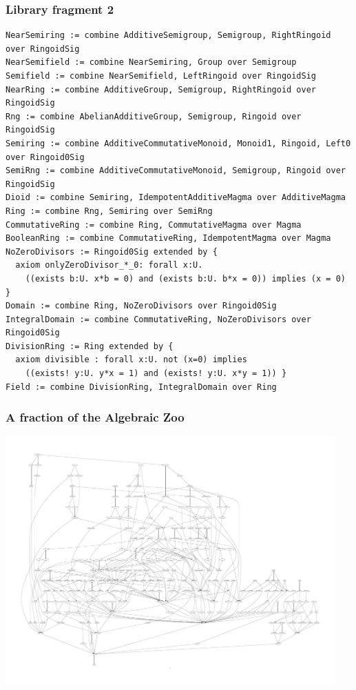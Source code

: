 \documentclass{beamer}
\begin{document}
\begin{frame}[t,fragile]
\frametitle{Library fragment 2}
\begin{lstlisting}
NearSemiring := combine AdditiveSemigroup, Semigroup, RightRingoid over RingoidSig
NearSemifield := combine NearSemiring, Group over Semigroup
Semifield := combine NearSemifield, LeftRingoid over RingoidSig
NearRing := combine AdditiveGroup, Semigroup, RightRingoid over RingoidSig
Rng := combine AbelianAdditiveGroup, Semigroup, Ringoid over RingoidSig
Semiring := combine AdditiveCommutativeMonoid, Monoid1, Ringoid, Left0 over Ringoid0Sig
SemiRng := combine AdditiveCommutativeMonoid, Semigroup, Ringoid over RingoidSig
Dioid := combine Semiring, IdempotentAdditiveMagma over AdditiveMagma
Ring := combine Rng, Semiring over SemiRng
CommutativeRing := combine Ring, CommutativeMagma over Magma
BooleanRing := combine CommutativeRing, IdempotentMagma over Magma
NoZeroDivisors := Ringoid0Sig extended by {
  axiom onlyZeroDivisor_*_0: forall x:U.
    ((exists b:U. x*b = 0) and (exists b:U. b*x = 0)) implies (x = 0) }
Domain := combine Ring, NoZeroDivisors over Ringoid0Sig
IntegralDomain := combine CommutativeRing, NoZeroDivisors over Ringoid0Sig
DivisionRing := Ring extended by {
  axiom divisible : forall x:U. not (x=0) implies 
    ((exists! y:U. y*x = 1) and (exists! y:U. x*y = 1)) }
Field := combine DivisionRing, IntegralDomain over Ring
\end{lstlisting}
\end{frame}

\begin{frame}[t]
\frametitle{A fraction of the Algebraic Zoo}
\vspace*{-0.8cm}\includegraphics[height=9.5cm]{fragment.pdf}
\end{frame}
\end{document}
